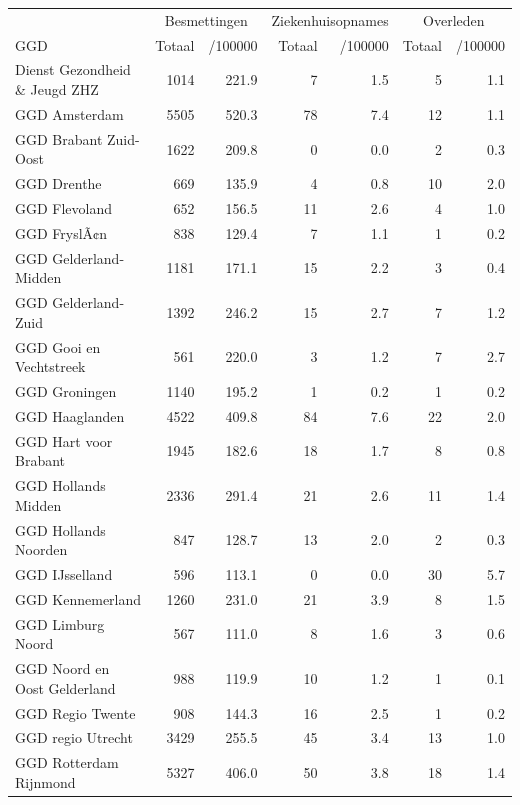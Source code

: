 \documentclass[
  english,
  man,floatsintext]{apa6}
\begin{document}
\begin{table}[H]
\centering\begingroup\fontsize{10}{12}\selectfont

\begin{threeparttable}
\begin{tabular}{lrrrrrr}
\toprule
\multicolumn{1}{c}{ } & \multicolumn{2}{c}{Besmettingen} & \multicolumn{2}{c}{Ziekenhuisopnames} & \multicolumn{2}{c}{Overleden} \\
\cmidrule(l{3pt}r{3pt}){2-3} \cmidrule(l{3pt}r{3pt}){4-5} \cmidrule(l{3pt}r{3pt}){6-7}
GGD & Totaal & /100000 & Totaal & /100000 & Totaal & /100000\\
\midrule
Dienst Gezondheid \& Jeugd ZHZ & 1014 & 221.9 & 7 & 1.5 & 5 & 1.1\\
GGD Amsterdam & 5505 & 520.3 & 78 & 7.4 & 12 & 1.1\\
GGD Brabant Zuid-Oost & 1622 & 209.8 & 0 & 0.0 & 2 & 0.3\\
GGD Drenthe & 669 & 135.9 & 4 & 0.8 & 10 & 2.0\\
GGD Flevoland & 652 & 156.5 & 11 & 2.6 & 4 & 1.0\\
GGD FryslÃ¢n & 838 & 129.4 & 7 & 1.1 & 1 & 0.2\\
GGD Gelderland-Midden & 1181 & 171.1 & 15 & 2.2 & 3 & 0.4\\
GGD Gelderland-Zuid & 1392 & 246.2 & 15 & 2.7 & 7 & 1.2\\
GGD Gooi en Vechtstreek & 561 & 220.0 & 3 & 1.2 & 7 & 2.7\\
GGD Groningen & 1140 & 195.2 & 1 & 0.2 & 1 & 0.2\\
GGD Haaglanden & 4522 & 409.8 & 84 & 7.6 & 22 & 2.0\\
GGD Hart voor Brabant & 1945 & 182.6 & 18 & 1.7 & 8 & 0.8\\
GGD Hollands Midden & 2336 & 291.4 & 21 & 2.6 & 11 & 1.4\\
GGD Hollands Noorden & 847 & 128.7 & 13 & 2.0 & 2 & 0.3\\
GGD IJsselland & 596 & 113.1 & 0 & 0.0 & 30 & 5.7\\
GGD Kennemerland & 1260 & 231.0 & 21 & 3.9 & 8 & 1.5\\
GGD Limburg Noord & 567 & 111.0 & 8 & 1.6 & 3 & 0.6\\
GGD Noord en Oost Gelderland & 988 & 119.9 & 10 & 1.2 & 1 & 0.1\\
GGD Regio Twente & 908 & 144.3 & 16 & 2.5 & 1 & 0.2\\
GGD regio Utrecht & 3429 & 255.5 & 45 & 3.4 & 13 & 1.0\\
GGD Rotterdam Rijnmond & 5327 & 406.0 & 50 & 3.8 & 18 & 1.4\\

\end{tabular}
\end{threeparttable}
\end{table}
\end{document}
